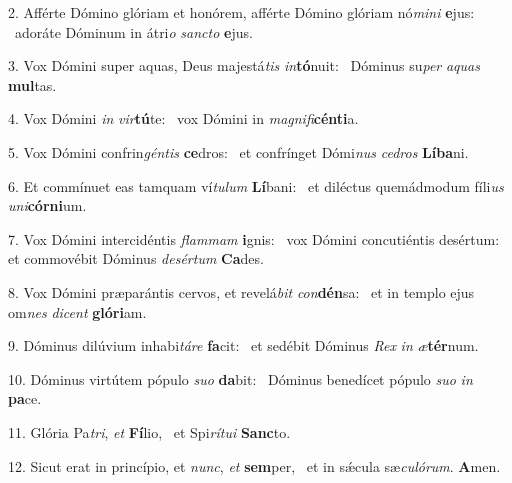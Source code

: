 2. Afférte Dómino glóriam et honórem, afférte Dómino glóriam nó\textit{mi}\textit{ni} \textbf{e}jus: \ast\  adoráte Dóminum in átri\textit{o} \textit{sanc}\textit{to} \textbf{e}jus.\

3. Vox Dómini super aquas, Deus majestá\textit{tis} \textit{in}\textbf{tó}nuit: \ast\  Dóminus su\textit{per} \textit{a}\textit{quas} \textbf{mul}tas.\

4. Vox Dómini \textit{in} \textit{vir}\textbf{tú}te: \ast\  vox Dómini in \textit{ma}\textit{gni}\textit{fi}\textbf{cén}\textbf{ti}a.\

5. Vox Dómini confrin\textit{gén}\textit{tis} \textbf{ce}dros: \ast\  et confrínget Dómi\textit{nus} \textit{ce}\textit{dros} \textbf{Lí}\textbf{ba}ni.\

6. Et commínuet eas tamquam ví\textit{tu}\textit{lum} \textbf{Lí}bani: \ast\  et diléctus quemádmodum fíli\textit{us} \textit{u}\textit{ni}\textbf{cór}\textbf{ni}um.\

7. Vox Dómini intercidéntis \textit{flam}\textit{mam} \textbf{i}gnis: \ast\  vox Dómini concutiéntis desértum: et commovébit Dóminus \textit{de}\textit{sér}\textit{tum} \textbf{Ca}des.\

8. Vox Dómini præparántis cervos, et revelá\textit{bit} \textit{con}\textbf{dén}sa: \ast\  et in templo ejus om\textit{nes} \textit{di}\textit{cent} \textbf{gló}\textbf{ri}am.\

9. Dóminus dilúvium inhabi\textit{tá}\textit{re} \textbf{fa}cit: \ast\  et sedébit Dóminus \textit{Rex} \textit{in} \textit{æ}\textbf{tér}num.\

10. Dóminus virtútem pópulo \textit{su}\textit{o} \textbf{da}bit: \ast\  Dóminus benedícet pópulo \textit{su}\textit{o} \textit{in} \textbf{pa}ce.\

11. Glória Pa\textit{tri}, \textit{et} \textbf{Fí}lio, \ast\  et Spi\textit{rí}\textit{tu}\textit{i} \textbf{Sanc}to.\

12. Sicut erat in princípio, et \textit{nunc}, \textit{et} \textbf{sem}per, \ast\  et in sǽcula sæ\textit{cu}\textit{ló}\textit{rum}. \textbf{A}men.\

